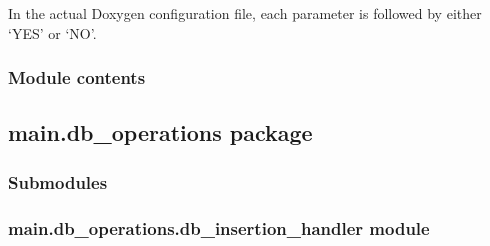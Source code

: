 \documentclass[letterpaper,10pt,english]{sphinxmanual}
\begin{document}
\sphinxAtStartPar
In the actual Doxygen configuration file, each parameter is followed by either ‘YES’ or ‘NO’.


\subsubsection{Module contents}
\label{\detokenize{main.config:module-main.config}}\label{\detokenize{main.config:module-contents}}
\sphinxstepscope


\subsection{main.db\_operations package}
\label{\detokenize{main.db_operations:main-db-operations-package}}\label{\detokenize{main.db_operations::doc}}

\subsubsection{Submodules}
\label{\detokenize{main.db_operations:submodules}}

\subsubsection{main.db\_operations.db\_insertion\_handler module}
\label{\detokenize{main.db_operations:module-main.db_operations.db_insertion_handler}}\label{\detokenize{main.db_operations:main-db-operations-db-insertion-handler-module}}
\end{document}
